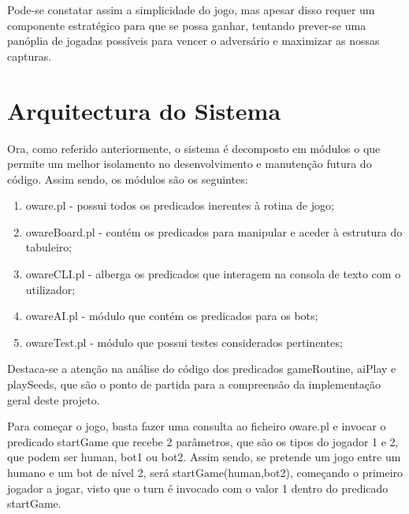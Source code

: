 \documentclass[15pt,a4paper]{article}
\begin{document}
Pode-se constatar assim a simplicidade do jogo, mas apesar disso requer um componente estratégico para que se possa ganhar, tentando prever-se uma panóplia de jogadas possíveis para vencer o adversário e maximizar as nossas capturas.

\section{Arquitectura do Sistema}
Ora, como referido anteriormente, o sistema é decomposto em módulos o que permite um melhor isolamento no desenvolvimento e manutenção futura do código. Assim sendo, os módulos são os seguintes:
\begin{enumerate}
  \item oware.pl - possui todos os predicados inerentes à rotina de jogo;
  \item owareBoard.pl - contém os predicados para manipular e aceder à estrutura do tabuleiro;
  \item owareCLI.pl - alberga os predicados que interagem na consola de texto com o utilizador;
  \item owareAI.pl - módulo que contém os predicados para os bots;
  \item owareTest.pl - módulo que possui testes considerados pertinentes;
\end{enumerate}

\indent Destaca-se a atenção na análise do código dos predicados gameRoutine, aiPlay e playSeeds, que são o ponto de partida para a compreensão da implementação geral deste projeto.

\indent Para começar o jogo, basta fazer uma consulta ao ficheiro oware.pl e invocar o predicado startGame que recebe 2 parâmetros, que são os tipos do jogador 1 e 2, que podem ser human, bot1 ou bot2. Assim sendo, se pretende um jogo entre um humano e um bot de nível 2, será startGame(human,bot2), começando o primeiro jogador a jogar, visto que o turn é invocado com o valor 1 dentro do predicado startGame. 


\newpage
\end{document}
